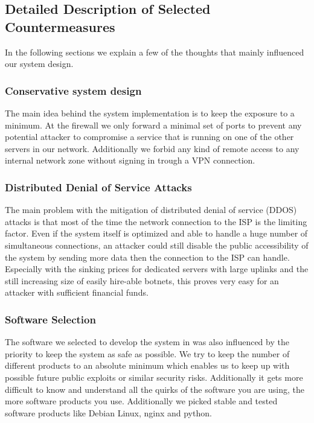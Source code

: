 \documentclass[a4paper, toc=index, 12pt, DIV14, twoside, BCOR2cm, headsepline, numbers=noenddot, bibliography=totoc]{report}
\begin{document}
\subsection{Detailed Description of Selected Countermeasures}

In the following sections we explain a few of the thoughts that mainly influenced our system design.

\subsubsection{Conservative system design}
The main idea behind the system implementation is to keep the exposure to a minimum. At the firewall we only forward a minimal set of ports to prevent any potential attacker to compromise a service that is running on one of the other servers in our network. Additionally we forbid any kind of remote access to any internal network zone without signing in trough a VPN connection.\newline

\subsubsection{Distributed Denial of Service Attacks}
The main problem with the mitigation of distributed denial of service (DDOS) attacks is that most of the time the network connection to the ISP is the limiting factor. Even if the system itself is optimized and able to handle a huge number of simultaneous connections, an attacker could still disable the public accessibility of the system by sending more data then the connection to the ISP can handle. Especially with the sinking prices for dedicated servers with large uplinks and the still increasing size of easily hire-able botnets, this proves very easy for an attacker with sufficient financial funds.

\subsubsection{Software Selection}
The software we selected to develop the system in was also influenced by the priority to keep the system as safe as possible. We try to keep the number of different products to an absolute minimum which enables us to keep up with possible future public exploits or similar security risks. Additionally it gets more difficult to know and understand all the quirks of the software you are using, the more software products you use.\newline
Additionally we picked stable and tested software products like Debian Linux, nginx and python.
\end{document}

